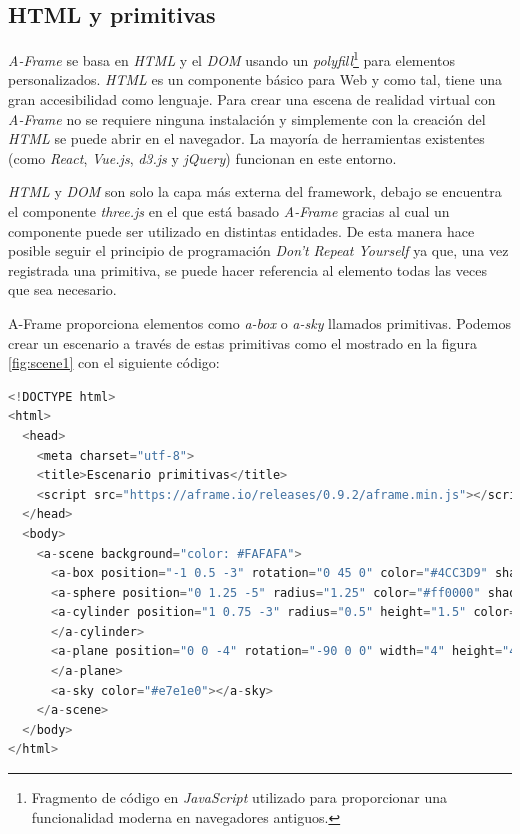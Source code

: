 \subsection{HTML y primitivas}
\textit{A-Frame }se basa en \textit{HTML} y el \textit{DOM} usando un \textit{polyfill}\footnote{Fragmento de código en \textit{JavaScript} utilizado para proporcionar una funcionalidad moderna en navegadores antiguos.} para elementos personalizados. \textit{HTML} es un componente básico para Web y como tal, tiene una gran accesibilidad como lenguaje. Para crear una escena de realidad virtual con \textit{A-Frame} no se requiere ninguna instalación y simplemente con la creación del \textit{HTML} se puede abrir en el navegador. La mayoría de herramientas existentes (como \textit{React}, \textit{Vue.js}, \textit{d3.js} y \textit{jQuery}) funcionan en este entorno. 

\textit{HTML} y \textit{DOM} son solo la capa más externa del framework, debajo se encuentra el componente \textit{three.js} en el que está basado \textit{A-Frame} gracias al cual un componente puede ser utilizado en distintas entidades. De esta manera hace posible seguir el principio de programación \textit{Don't Repeat Yourself} ya que, una vez registrada una primitiva, se puede hacer referencia al elemento todas las veces que sea necesario.  

A-Frame proporciona elementos como \textit{a-box} o \textit{a-sky} llamados primitivas. Podemos crear un escenario a través de estas primitivas como el mostrado en la figura \ref{fig:scene1} con el siguiente código: 

\begin{lstlisting}[language=javascript, caption=Código con primitivas que representa un escenario]
<!DOCTYPE html>
<html>
  <head>
    <meta charset="utf-8">
    <title>Escenario primitivas</title>
    <script src="https://aframe.io/releases/0.9.2/aframe.min.js"></script>
  </head>
  <body>
    <a-scene background="color: #FAFAFA">
      <a-box position="-1 0.5 -3" rotation="0 45 0" color="#4CC3D9" shadow></a-box>
      <a-sphere position="0 1.25 -5" radius="1.25" color="#ff0000" shadow></a-sphere>
      <a-cylinder position="1 0.75 -3" radius="0.5" height="1.5" color="#FFC65D" shadow>
      </a-cylinder>
      <a-plane position="0 0 -4" rotation="-90 0 0" width="4" height="4" color=" #1cde83" shadow>
      </a-plane>
      <a-sky color="#e7e1e0"></a-sky>
    </a-scene>
  </body>
</html>
\end{lstlisting}

